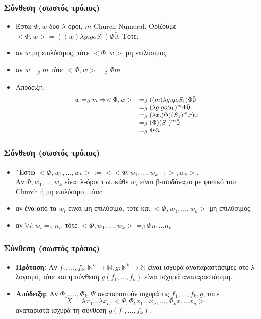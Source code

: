 \documentclass{beamer}
\begin{document}
\begin{frame}
  \frametitle{Σύνθεση (σωστός τρόπος)}
  \begin{itemize}
  \item Έστω $\Phi, w$ δύο $\lambda$-όροι, $\bar{m}$ Church
    Numeral. Όρίζουμε $<\Phi, w> = ((w) \lambda g . g o S_1) \Phi
    \bar{0}$. Τότε: \pause
  \item αν $w$ μη επιλύσιμος, τότε $<\Phi, w>$ μη επιλύσιμος. \pause
  \item αν $w =_\beta \bar{m}$ τότε $<\Phi, w> =_\beta \Phi \bar{m}$ \pause
  \item Απόδειξη: 
    $$
    \small
    \begin{array}{ll}
      w =_\beta \bar{m} \Rightarrow <\Phi, w>
      & =_\beta ((\bar{m}) \lambda g . g o S_1) \Phi \bar{0}\\
      & =_\beta (\lambda g . g o S_1)^m \Phi \bar{0} \\
      & =_\beta (\lambda x . (\Phi) (S_1)^m x) \bar{0} \\
      & =_\beta (\Phi) (S_1)^m \bar{0} \\
      & =_\beta \Phi \bar{m}
    \end{array}
    $$           	
  \end{itemize}
\end{frame}

\begin{frame}
  \frametitle{Σύνθεση (σωστός τρόπος)}
  \begin{itemize}
  \item ´Εστω $<\Phi, w_1,\ldots, w_k> := <<\Phi, w_1,\ldots,
    w_{k-1}>, w_k>$. \\ Αν $\Phi, w_1,\ldots, w_k$ είναι λ-όροι
    τ.ω. κάθε $w_i$ είναι β-ισοδύναμο με φυσικό του Church ή μη
    επιλύσιμο, τότε: \pause
  \item αν ένα από τα $w_i$ είναι μη επιλύσιμο, τότε και $<\Phi,
    w_1,\ldots, w_k>$ μη επιλύσιμος. \pause
  \item αν $\forall i: w_i =_\beta n_i$, τότε $<\Phi, w_1,\ldots, w_k>
    =_\beta \Phi n_1 \ldots n_k$
  \end{itemize}
\end{frame}

\begin{frame}
  \frametitle{Σύνθεση (σωστός τρόπος)}
  \begin{itemize}
  \item \textbf{Πρόταση:} Αν $f_1,\ldots,f_k : \mathbb{N}^n
    \rightarrow \mathbb{N}, g : \mathbb{N}^k \rightarrow \mathbb{N}$
    είναι ισχυρά αναπαραστάσιμες στο λ-λογισμό, τότε και η σύνθεση
    $g(f_1,\ldots,f_k)$ είναι ισχυρά αναπαραστάσιμη. \pause
  \item \textbf{Απόδειξη:} Αν $\Phi_1, \ldots, \Phi_k, \Psi$
    αναπαριστούν ισχυρά τις $f_1,\ldots, f_k, g$, τότε
    $$X = \lambda x_1 \ldots \lambda x_n . <\Psi, \Phi_1 x_1 \ldots
    x_n, \ldots, \Phi_k x_1 \ldots x_n> $$ αναπαριστά ισχυρά τη
    σύνθεση $g(f_1,\ldots,f_k)$.
  \end{itemize}
\end{frame}
\end{document}
